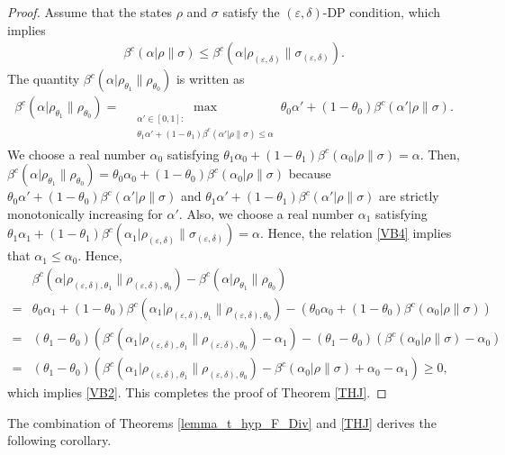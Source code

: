\documentclass[onecolumn,ldraftcls, 11pt]{IEEEtran}
\newcommand{\eps}{\varepsilon}
\begin{document}
\begin{proof}
Assume that the states $\rho$ and $\sigma$ satisfy the $(\eps,\delta)$-DP condition, which implies
\begin{align}
\beta^c(\alpha| \rho\|\sigma) 
\le \beta^c(\alpha| \rho_{(\eps,\delta)}\|\sigma_{(\eps,\delta)})
\label{VB4}.
\end{align}
The quantity $\beta^c(\alpha| \rho_{\theta_1}\|\rho_{\theta_0}) $
is written as 
\begin{align}
\beta^c(\alpha| \rho_{\theta_1}\|\rho_{\theta_0}) 
=&    \max_{\substack{\alpha'\in [0,1]:\\
        \theta_1 \alpha'+(1-\theta_1) \beta^c(\alpha'| \rho\|\sigma)\le \alpha 
        }}\theta_0 \alpha'+(1-\theta_0) \beta^c(\alpha'| \rho\|\sigma)  .
  \end{align}
We choose a real number $\alpha_0$ satisfying
  $\theta_1 \alpha_0+(1-\theta_1) \beta^c(\alpha_0| \rho\|\sigma)= \alpha$.
  Then, 
$\beta^c(\alpha| \rho_{\theta_1}\|\rho_{\theta_0}) 
=\theta_0 \alpha_0+(1-\theta_0) \beta^c(\alpha_0| \rho\|\sigma)
$ because 
$\theta_0 \alpha'+(1-\theta_0) \beta^c(\alpha'| \rho\|\sigma) $
and
$\theta_1 \alpha'+(1-\theta_1) \beta^c(\alpha'| \rho\|\sigma)$
are strictly monotonically increasing for $\alpha'$.
Also, we choose a real number $\alpha_1$ satisfying
  $\theta_1 \alpha_1+(1-\theta_1) \beta^c( \alpha_1|
  \rho_{(\eps,\delta)}\|\sigma_{(\eps,\delta)})= \alpha$.
Hence, the relation \eqref{VB4} implies that
$\alpha_1\le \alpha_0$.
Hence, 
\begin{align*}
&\beta^c(\alpha| \rho_{(\eps,\delta),\theta_1}\|\rho_{(\eps,\delta),\theta_0})
-\beta^c(\alpha| \rho_{\theta_1}\|\rho_{\theta_0}) \\
=&\theta_0 \alpha_1+(1-\theta_0) \beta^c(\alpha_1| \rho_{(\eps,\delta),\theta_1}\|\rho_{(\eps,\delta),\theta_0})
-
(\theta_0 \alpha_0+(1-\theta_0) \beta^c(\alpha_0| \rho\|\sigma)) \\
=&
(\theta_1-\theta_0) (\beta^c(\alpha_1| \rho_{(\eps,\delta),\theta_1}\|\rho_{(\eps,\delta),\theta_0})
-\alpha_1)
-
(\theta_1-\theta_0) (\beta^c(\alpha_0| \rho\|\sigma)
-\alpha_0) \\
=&
(\theta_1-\theta_0) (
\beta^c(\alpha_1| \rho_{(\eps,\delta),\theta_1}\|\rho_{(\eps,\delta),\theta_0})
-\beta^c(\alpha_0| \rho\|\sigma)
+\alpha_0-\alpha_1) \ge 0,
\end{align*}
which implies \eqref{VB2}. This completes the proof of Theorem \ref{THJ}.
\end{proof}

The combination of Theorems \ref{lemma_t_hyp_F_Div} and \ref{THJ} derives the following corollary.
\end{document}
